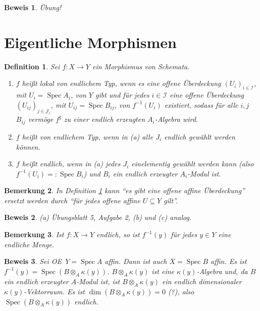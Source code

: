 \documentclass[a4paper,oneside]{scrbook}
\theoremstyle{break}
\newtheorem{Def}{Definition}[section]
\newtheorem{Bem}[Def]{Bemerkung}
\theoremstyle{nonumberbreak}
\theoremstyle{nonumberplain}
\newtheorem{Bew}{Beweis}
\theoremstyle{break}
\newcommand{\defeql}[0]{=\mathrel{\mathop:}}
\newcommand{\Spec}{%
	\ensuremath{\operatorname{Spec}}%
}
\renewcommand{\OE}{O\!\!E~}
\begin{document}
\begin{Bew}
  Übung!
\end{Bew}

\section{Eigentliche Morphismen}

\begin{Def}
  \label{def:8.1}
  Sei $f:X\to Y$ ein Morphismus von Schemata.
  \begin{enumerate}
  \item $f$ heißt \emph{lokal von endlichem Typ}, wenn es eine offene Überdeckung $(U_i)_{i\in\mathcal I}$, mit $U_i=\Spec A_i$, von $Y$ gibt
    und für jedes $i\in\mathcal I$ eine offene Überdeckung $(U_{ij})_{j\in\mathcal J_i}$, mit $U_{ij}=\Spec B_{ij}$, von $f^{-1}(U_i)$ existiert, 
    sodass für alle $i,j$ $B_{ij}$ vermöge $f^\sharp$ zu einer endlich erzeugten $A_i$-Algebra wird.
  \item $f$ heißt \emph{von endlichem Typ}, wenn in (a) alle $J_i$ endlich gewählt werden können.
  \item $f$ heißt \emph{endlich}, wenn in (a) jedes $J_i$ einelementig gewählt werden kann (also $f^{-1}(U_i)\defeql\Spec B_i$)
    und $B_i$ ein endlich erzeugter $A_i$-\emph{Modul} ist.
  \end{enumerate}
\end{Def}

\begin{Bem}
  \label{bem:8.2}
  In Definition \ref{def:8.1} kann ``es gibt eine offene affine Überdeckung'' ersetzt werden durch ``für jedes offene affine $U\subseteq Y$ gilt''.
\end{Bem}

\begin{Bew}
 (a) Übungsblatt 5, Aufgabe 2, (b) und (c) analog.
\end{Bew}

\begin{Bem}
  \label{bem:8.3}
  Ist $f:X\to Y$ endlich, so ist $f^{-1}(y)$ für jedes $y\in Y$ eine endliche Menge.
\end{Bem}

\begin{Bew}
  Sei \OE $Y=\Spec A$ affin. Dann ist auch $X=\Spec B$ affin. Es ist $f^{-1}(y)=\Spec(B\otimes_A\kappa(y))$.
  $B\otimes_A\kappa(y)$ ist eine $\kappa(y)$-Algebra und, da $B$ ein endlich erzeugter $A$-Modul ist, ist $B\otimes_A\kappa(y)$ ein 
  endlich dimensionaler $\kappa(y)$-Vektorraum. Es ist $\dim(B\otimes_A\kappa(y))=0$ (?), also $\Spec (B\otimes_A\kappa(y))$ endlich.
\end{Bew}
\end{document}
